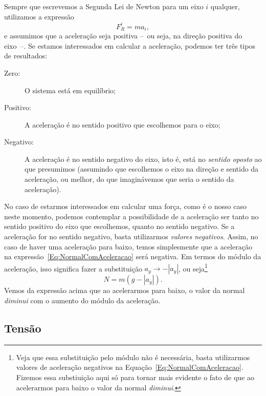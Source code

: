 Sempre que escrevemos a Segunda Lei de Newton para um eixo $i$ qualquer, utilizamos a expressão
\begin{equation}
    F_R^i = m a_i,
\end{equation}
%
e assumimos que a aceleração seja positiva --~ou seja, na direção positiva do eixo~--. Se estamos interessados em calcular a aceleração, podemos ter três tipos de resultados:
\begin{description}
    \item[Zero:] O sistema está em equilíbrio;
    \item[Positivo:] A aceleração é no sentido positivo que escolhemos para o eixo;
    \item[Negativo:] A aceleração é no sentido negativo do eixo, isto é, está no \emph{sentido oposto} ao que presumimos (assumindo que escolhemos o eixo na direção e sentido da aceleração, ou melhor, do que imaginávemos que seria o sentido da aceleração).
\end{description}

No caso de estarmos interessados em calcular uma força, como é o nosso caso neste momento, podemos contemplar a possibilidade de a aceleração ser tanto no sentido positivo do eixo que escolhemos, quanto no sentido negativo. Se a aceleração for no sentido negativo, basta utilizarmos \emph{valores negativos}. Assim, no caso de haver uma aceleração para baixo, temos simplesmente que a aceleração na expressão~\eqref{Eq:NormalComAceleracao} será negativa. Em termos do módulo da aceleração, isso significa fazer a substituição $a_y \to -|a_y|$, ou seja\footnote{Veja que essa substituição pelo módulo não é necessária, basta utilizarmos valores de aceleração negativos na Equação~\ref{Eq:NormalComAceleracao}. Fizemos essa substiuição aqui só para tornar mais evidente o fato de que ao acelerarmos para baixo o valor da normal \emph{diminui}.}
\begin{equation}
    N = m(g - |a_y|).
\end{equation} 
%
Vemos da expressão acima que ao acelerarmos para baixo, o valor da normal \emph{diminui} com o aumento do módulo da aceleração.

\subsection{Tensão} 

